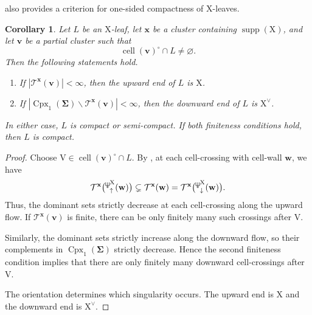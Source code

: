\documentclass[11pt,reqno]{amsart}
\newcommand{\Neptune}{\mathord{\text{\tikz[baseline=-.5ex,scale=.13]{\draw[line width=.45pt] (0,0)--(0,1.8) (-.6,1.8)--(-.6,.8)--(.6,.8)--(.6,1.8) (-.35,.35)--(.35,.35);}}}}
\theoremstyle{plain}
\newtheorem{corollary}[theorem]{Corollary}
\theoremstyle{definition}
\numberwithin{equation}{section}
\newcommand\<{\langle}
\renewcommand\>{\rangle}
\renewcommand{\setminus}{\smallsetminus}
\newcommand{\on}[1]{\operatorname{#1}}
\def\CCx{\on{Cpx}}   %
\def\cc{\on{cell}}  %
\def\ww{\mathbf{w}}
\def\vv{\mathbf{v}}
\def\sink{X}
\newcommand{\flowU}[1]{\on{Evo}_{\uparrow}^{#1}}
\newcommand{\ccpt}[1]{\mathrm{#1}}%
\def\xevo{\ccpt{X}}%
\def\seeds{\mathbf{\Sigma}}
\def\xx{\mathbf{x}}%
\newcommand{\suppd}[1]{\operatorname{\Neptune}_{\downarrow}^{#1}}
\newcommand{\suppu}[1]{\operatorname{\Neptune}_{\uparrow}^{#1}}
\newcommand{\DT}[1]{#1^{\vee}}
\def\Xevo{\DT{\ccpt{X}}}
\newcommand{\dom}[1]{\mathcal{T}^{#1}}
\begin{document}



 also provides a criterion for one-sided compactness of $\xevo$-leaves.


\begin{corollary}
Let $L$ be an $\xevo$-leaf, let $\xx$ be
a cluster containing $\operatorname{supp}(\xevo)$, and let
$\vv$ be a partial cluster such that
\[
   \cc(\vv)^\circ
    \cap L\neq\varnothing.
\]
Then the following statements hold.
\begin{enumerate}
    \item If $|\dom{\xx}(\vv)|<\infty$, 
    then the upward end of $L$ is $\xevo$.
    \item If
    $|\CCx_1(\seeds)\setminus\dom{\xx}(\vv)|<\infty$,
    then the downward end of $L$ is
    $\Xevo$.
\end{enumerate}
In either case, $L$ is compact or semi-compact.
If both finiteness conditions hold, then $L$ is compact.
\end{corollary}

\begin{proof}
Choose $\ccpt{V}\in\cc(\vv)^\circ\cap L$.
By , at each cell-crossing with cell-wall $\ww$, we have
\[
    \dom{\xx}
        \bigl(\suppu{\mathrm{X}}(\ww)\bigr)
    \subsetneq
    \dom{\xx}(\ww)
    =
    \dom{\xx}
        \bigl(\suppd{\mathrm{X}}(\ww)\bigr).
\]
Thus, the dominant sets strictly decrease at each cell-crossing along the upward flow. 
If $\dom{\xx}(\vv)$ is finite, there can be only finitely many such crossings after $\ccpt{V}$.

Similarly, the dominant sets strictly increase along the downward flow, so their complements in $\CCx_1(\seeds)$ strictly decrease. 
Hence the second finiteness condition implies that there are only finitely many
downward cell-crossings after $\ccpt{V}$.

The orientation determines which singularity occurs.
The upward end is $\xevo$ and the downward end is $\Xevo$.

\end{proof}

\appendix


\end{document}
